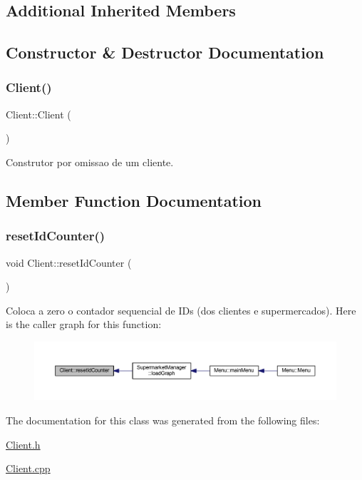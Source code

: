 \subsection*{Additional Inherited Members}


\subsection{Constructor \& Destructor Documentation}
\mbox{\label{class_client_ae51af7aa6b8f591496a8f6a4a87a14bf}} 
\subsubsection{\texorpdfstring{Client()}{Client()}}
{\footnotesize\ttfamily Client\+::\+Client (\begin{DoxyParamCaption}{ }\end{DoxyParamCaption})}

Construtor por omissao de um cliente. 

\subsection{Member Function Documentation}
\mbox{\label{class_client_acf31317770c47dc7087dceffe5663b73}} 
\subsubsection{\texorpdfstring{reset\+Id\+Counter()}{resetIdCounter()}}
{\footnotesize\ttfamily void Client\+::reset\+Id\+Counter (\begin{DoxyParamCaption}{ }\end{DoxyParamCaption})}

Coloca a zero o contador sequencial de I\+Ds (dos clientes e supermercados). Here is the caller graph for this function\+:
\nopagebreak
\begin{figure}[H]
\begin{center}
\leavevmode
\includegraphics[width=350pt]{class_client_acf31317770c47dc7087dceffe5663b73_icgraph}
\end{center}
\end{figure}


The documentation for this class was generated from the following files\+:\begin{DoxyCompactItemize}
\item 
\hyperlink{_client_8h}{Client.\+h}\item 
\hyperlink{_client_8cpp}{Client.\+cpp}\end{DoxyCompactItemize}
